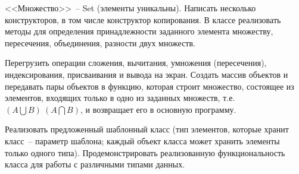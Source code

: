
<<Множество>>~-- Set (элементы уникальны). Написать несколько конструкторов, в том
числе конструктор копирования. В классе реализовать методы для определения
принадлежности заданного элемента множеству, пересечения, объединения, разности двух
множеств.

Перегрузить операции сложения, вычитания, умножения (пересечения),
индексирования, присваивания и вывода на экран. Создать массив объектов и передавать
пары объектов в функцию, которая строит множество, состоящее из элементов, входящих
только в одно из заданных множеств, т.е. $(A\bigcup B) \ (A\bigcap B)$, и возвращает его в основную
программу.

Реализовать предложенный шаблонный класс (тип элементов, которые
хранит класс~-- параметр шаблона; каждый объект класса может хранить
элементы только одного типа). Продемонстрировать реализованную
функциональность класса для работы с различными типами данных.

